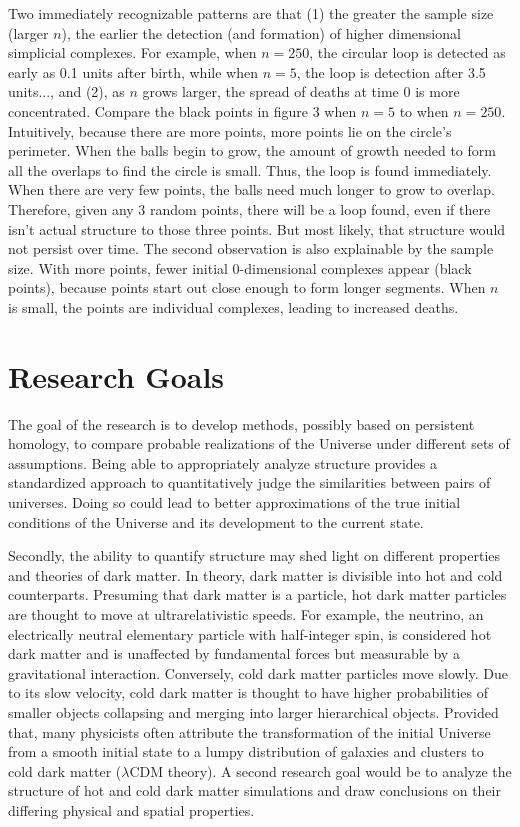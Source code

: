 \documentclass[12pt]{article}
\begin{document}
Two immediately recognizable patterns are that (1) the greater the sample size (larger $n$), the earlier the detection (and formation) of higher dimensional simplicial complexes. For example, when $n = 250$, the circular loop is detected as early as 0.1 units after birth, while when $n = 5$, the loop is detection after 3.5 units..., and (2), as $n$ grows larger, the spread of deaths at time 0 is more concentrated. Compare the black points in figure 3 when $n = 5$ to when $n = 250$. Intuitively, because there are more points, more points lie on the circle's perimeter. When the balls begin to grow, the amount of growth needed to form all the overlaps to find the circle is small. Thus, the loop is found immediately. When there are very few points, the balls need much longer to grow to overlap. Therefore, given any 3 random points, there will be a loop found, even if there isn't actual structure to those three points. But most likely, that structure would not persist over time. The second observation is also explainable by the sample size. With more points, fewer initial 0-dimensional complexes appear (black points), because points start out close enough to form longer segments. When $n$ is small, the points are individual complexes, leading to increased deaths.

\section{Research Goals}
The goal of the research is to develop methods, possibly based on persistent homology, to compare probable realizations of the Universe under different sets of assumptions. Being able to appropriately analyze structure provides a standardized approach to quantitatively judge the similarities between pairs of universes. Doing so could lead to better approximations of the true initial conditions of the Universe and its development to the current state. 

Secondly, the ability to quantify structure may shed light on different properties and theories of dark matter. In theory, dark matter is divisible into hot and cold counterparts. Presuming that dark matter is a particle, hot dark matter particles are thought to move at ultrarelativistic speeds. For example, the neutrino, an electrically neutral elementary particle with half-integer spin, is considered hot dark matter and is unaffected by fundamental forces but measurable by a gravitational interaction. Conversely, cold dark matter particles move slowly. Due to its slow velocity, cold dark matter is thought to have higher probabilities of smaller objects collapsing and merging into larger hierarchical objects. Provided that, many physicists often attribute the transformation of the initial Universe from a smooth initial state to a lumpy distribution of galaxies and clusters to cold dark matter ($\lambda$CDM theory). A second research goal would be to analyze the structure of hot and cold dark matter simulations and draw conclusions on their differing physical and spatial properties. 
\end{document}
